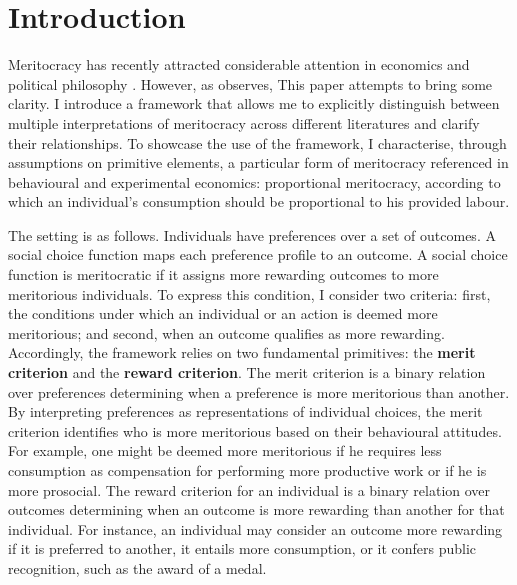 \section{Introduction}\label{sec:intromerit}

Meritocracy has recently attracted considerable attention in economics and political philosophy \citep{markovitsMeritocracyTrap2019,mulliganJusticeMeritocraticState2018,sandelTyrannyMeritWhat2020, tiroleMeritocracySocialJustice2022}. However, as \citet[p. 5]{senMeritJustice2000} observes,  This paper attempts to bring some clarity. I introduce a framework that allows me to explicitly distinguish between multiple interpretations of meritocracy across different literatures and clarify their relationships. To showcase the use of the framework, I characterise, through assumptions on primitive elements, a particular form of meritocracy referenced in behavioural and experimental economics: proportional meritocracy, according to which an individual's consumption should be proportional to his provided labour.

The setting is as follows. Individuals have preferences over a set of outcomes. A social choice function maps each preference profile to an outcome. A social choice function is meritocratic if it assigns more rewarding outcomes to more meritorious individuals. To express this condition, I consider two criteria: first, the conditions under which an individual or an action is deemed more meritorious; and second, when an outcome qualifies as more rewarding. Accordingly, the framework relies on two fundamental primitives: the \textbf{merit criterion} and the \textbf{reward criterion}. The merit criterion is a binary relation over preferences determining when a preference is more meritorious than another. By interpreting preferences as representations of individual choices, the merit criterion identifies who is more meritorious based on their behavioural attitudes. For example, one might be deemed more meritorious if he requires less consumption as compensation for performing more productive work or if he is more prosocial. The reward criterion for an individual is a binary relation over outcomes determining when an outcome is more rewarding than another for that individual. For instance, an individual may consider an outcome more rewarding if it is preferred to another, it entails more consumption, or it confers public recognition, such as the award of a medal.

